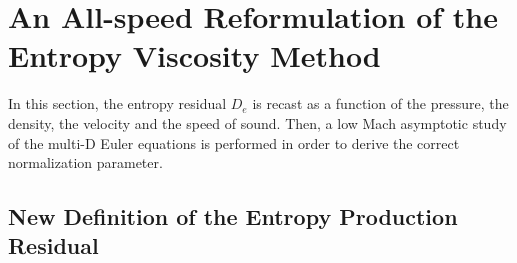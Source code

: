 \documentclass[preprint,10pt]{elsarticle}
\begin{document}
\section{An All-speed Reformulation of the Entropy Viscosity Method} \label{sec:extension}

In this section, the entropy residual $D_e$ is recast as a function of the pressure, the density, the velocity and the speed of sound. Then, a low Mach asymptotic study of the multi-D Euler equations is performed in order to derive the correct normalization parameter. 

\subsection{New Definition of the Entropy Production Residual}\label{sec:new_ent_prod} 
\end{document}
